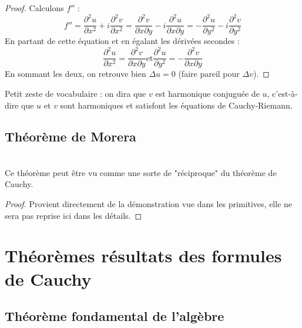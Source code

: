 \begin{proof}
	Calculons $f''$ :
	\begin{equation}
		f'' = \frac{\partial^2 u}{\partial x^2} + i\frac{\partial^2 v}{\partial x^2} = \frac{\partial^2 v
			}{\partial x\partial y} -i\frac{\partial^2 u}{\partial x \partial y} = -\frac{\partial^2 u}{
			\partial y^2} - i\frac{\partial^2v}{\partial y^2}
	\end{equation}
	En partant de cette équation et en égalant les dérivées secondes :
	\begin{equation}
		\frac{\partial^2u}{\partial x^2} = \frac{\partial^2 v}{\partial x \partial y} \text{et} \frac{
			\partial^2u}{\partial y^2} = -\frac{\partial^2 v}{\partial x \partial y}
	\end{equation}
	En sommant les deux, on retrouve bien $\Delta u = 0$ (faire pareil pour $\Delta v$).
\end{proof}
Petit zeste de vocabulaire : on dira que $v$ est  harmonique conjuguée de $u$, c'est-à-dire que
$u$ et $v$ sont harmoniques et satisfont les équations de Cauchy-Riemann.
	
	
\subsection{Théorème de Morera}
\ \\
Ce théorème peut être vu comme une sorte de "réciproque" du théorème de Cauchy.
\begin{proof}
	Provient directement de la démonstration vue dans les primitives, elle ne sera pas reprise ici
	dans les détails.
\end{proof}
		
\section{Théorèmes résultats des formules de Cauchy}
\subsection{Théorème fondamental de l'algèbre}
\ \\
	
